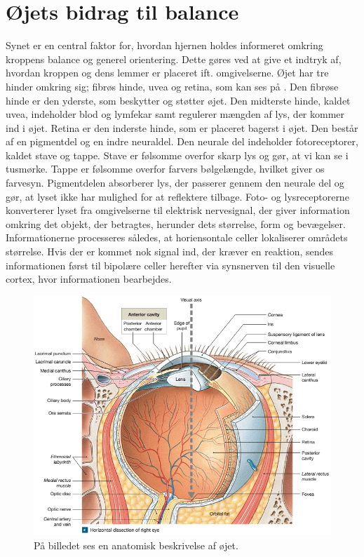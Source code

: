 \section{Øjets bidrag til balance}
Synet er en central faktor for, hvordan hjernen holdes informeret omkring kroppens balance og generel orientering. Dette gøres ved at give et indtryk af, hvordan kroppen og dens lemmer er placeret ift. omgivelserne. Øjet har tre hinder omkring sig; fibrøs hinde, uvea og retina, som kan ses på . Den fibrøse hinde er den yderste, som beskytter og støtter øjet. Den midterste hinde, kaldet uvea, indeholder blod og lymfekar samt regulerer mængden af lys, der kommer ind i øjet. Retina er den inderste hinde, som er placeret bagerst i øjet. Den består af en pigmentdel og en indre neuraldel. Den neurale del indeholder fotoreceptorer, kaldet stave og tappe. Stave er følsomme overfor skarp lys og gør, at vi kan se i tusmørke. Tappe er følsomme overfor farvers bølgelængde, hvilket giver os farvesyn. Pigmentdelen absorberer lys, der passerer gennem den neurale del og gør, at lyset ikke har mulighed for at reflektere tilbage. Foto- og lysreceptorerne konverterer lyset fra omgivelserne til elektrisk nervesignal, der giver information omkring det objekt, der betragtes, herunder dets størrelse, form og bevægelser. Informationerne processeres således, at horiensontale celler lokaliserer områdets størrelse. Hvis der er kommet nok signal ind, der kræver en reaktion, sendes informationen først til bipolære celler herefter via synsnerven til den visuelle cortex, hvor informationen bearbejdes. \cite{Martini2012}     

\begin{figure}[H]
	\centering
	\includegraphics[scale=0.75]{figures/bProblemanalyse/Oejets-anatomi.png}
	\caption{På billedet ses en anatomisk beskrivelse af øjet. \cite{Martini2012}}
	\label{Oejet}
\end{figure}

